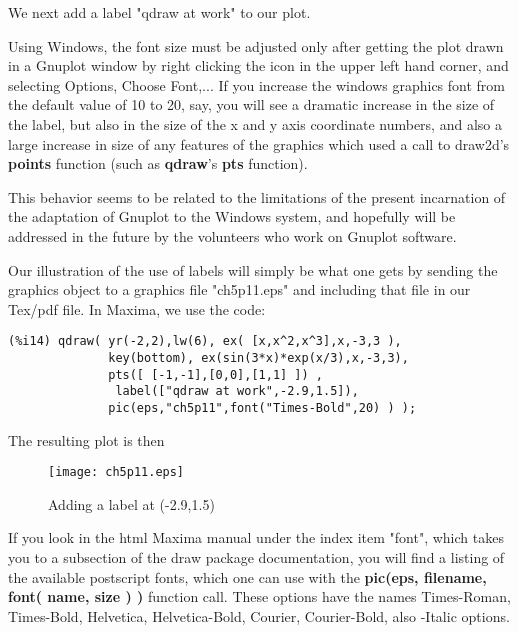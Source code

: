\documentclass[12pt]{article}
\begin{document}
  \smallskip
We next add a label "qdraw at work" to our plot. 

\smallskip

Using Windows, the font size must be adjusted only after getting
  the plot drawn in a Gnuplot window by right clicking the icon in
  the upper left hand corner, and selecting Options, Choose Font,...
If you increase the windows graphics font from the default value of 10
  to 20, say, you will see a dramatic increase in the size of the
  label, but also in the size of the x and y axis coordinate numbers, and
  also a large increase in size of any features of the graphics which
  used a call to draw2d's \textbf{points} function (such as \textbf{qdraw}'s
  \textbf{pts} function).

\smallskip
This behavior seems to be related to the limitations of the present incarnation of
  the adaptation of Gnuplot to the Windows system, and hopefully will be addressed
  in the future by the volunteers who work on Gnuplot software.

\smallskip
Our illustration of the use of labels will simply be what one gets by
  sending the graphics object to a graphics file "ch5p11.eps" and including
  that file in our Tex/pdf file.
In Maxima, we use the code:
\small
\begin{verbatim}
(%i14) qdraw( yr(-2,2),lw(6), ex( [x,x^2,x^3],x,-3,3 ),
              key(bottom), ex(sin(3*x)*exp(x/3),x,-3,3),
              pts([ [-1,-1],[0,0],[1,1] ]) ,
               label(["qdraw at work",-2.9,1.5]),
              pic(eps,"ch5p11",font("Times-Bold",20) ) );
\end{verbatim}
\normalsize
\newpage
  
The resulting plot is then

\begin{figure} [h]
   \centerline{\texttt{[image: ch5p11.eps]} }
	\caption{ Adding a label at (-2.9,1.5) }
\end{figure}        
 
If you look in the html Maxima manual under the index item "font", which
  takes you to a subsection of the draw package documentation, you will find
  a listing of the available postscript fonts, which one can use with the
  \textbf{pic(eps, filename, font( name, size ) ) } function call.
These options have the names Times-Roman, Times-Bold, Helvetica, Helvetica-Bold,
  Courier, Courier-Bold, also -Italic options.
\end{document}
